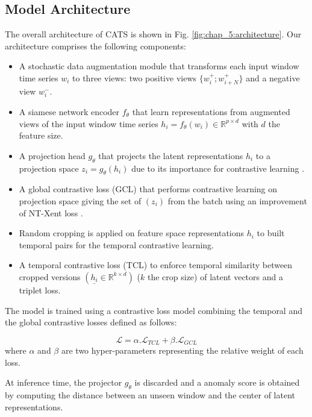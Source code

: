 \subsection{Model Architecture}
The overall architecture of CATS is shown in Fig. \ref{fig:chap_5:architecture}. Our architecture comprises the following components:
\begin{itemize}
    \item A stochastic data augmentation module that transforms each input window time series $w_i$ to three views: two positive views $\{w_i^{+}; w_{i+N}^{+}\}$ and a negative view $w_i^{-}$.
    \item A siamese network encoder $f_{\theta}$ that learn representations from augmented views of the input window time series $h_i = f_{\theta}(w_i) \in \mathbb{R}^{p \times d}$ with $d$ the feature size.
    \item A projection head $g_{\theta}$ that projects the latent representations $h_i$ to a projection space $z_i = g_{\theta}(h_i)$ due to its importance for contrastive learning \cite{chen2020simple}.
    \item A global contrastive loss (GCL) that performs contrastive learning on projection space giving the set of $(z_i)$ from the batch using an improvement of NT-Xent loss \cite{Sohn2016ImprovedDM}.
    \item Random cropping is applied on feature space representations $h_i$ to built temporal pairs for the temporal contrastive learning.
    \item A temporal contrastive loss (TCL) to enforce temporal similarity between cropped versions $(\underline{h_i} \in \mathbb{R}^{k \times d})$ ($k$ the crop size) of latent vectors and a triplet loss.

\end{itemize}

The model is trained using a contrastive loss model combining the temporal and the global contrastive losses defined as follows:

\begin{equation}\label{loss_total}
    \mathcal{L} = \alpha . \mathcal{L}_{TCL} + \beta . \mathcal{L}_{GCL}
\end{equation}
where $\alpha$ and $\beta$ are two hyper-parameters representing the relative weight of each loss. %

At inference time, the projector $g_{\theta}$ is discarded and a anomaly score is obtained by computing the distance between an unseen window and the center of latent representations.

